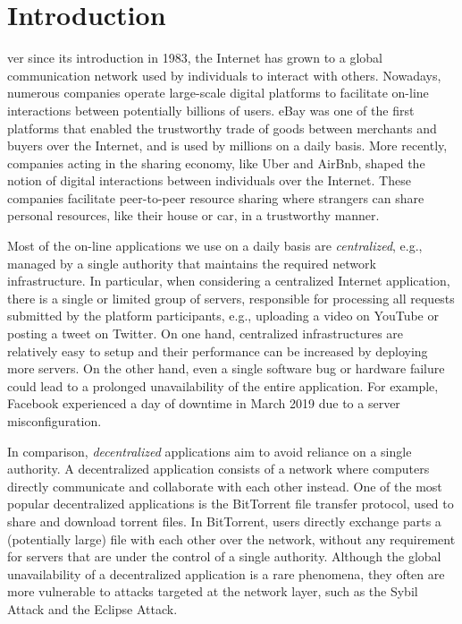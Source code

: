 \chapter{Introduction}
\label{introduction}


ver since its introduction in 1983, the Internet has grown to a global communication network used by individuals to interact with others.
Nowadays, numerous companies operate large-scale digital platforms to facilitate on-line interactions between potentially billions of users.
eBay was one of the first platforms that enabled the trustworthy trade of goods between merchants and buyers over the Internet, and is used by millions on a daily basis.
More recently, companies acting in the sharing economy, like Uber and AirBnb, shaped the notion of digital interactions between individuals over the Internet.
These companies facilitate peer-to-peer resource sharing where strangers can share personal resources, like their house or car, in a trustworthy manner.

Most of the on-line applications we use on a daily basis are \emph{centralized}, e.g., managed by a single authority that maintains the required network infrastructure. %
In particular, when considering a centralized Internet application, there is a single or limited group of servers, responsible for processing all requests submitted by the platform participants, e.g., uploading a video on YouTube or posting a tweet on Twitter.
On one hand, centralized infrastructures are relatively easy to setup and their performance can be increased by deploying more servers.
On the other hand, even a single software bug or hardware failure could lead to a prolonged unavailability of the entire application.
For example, Facebook experienced a day of downtime in March 2019 due to a server misconfiguration.

In comparison, \emph{decentralized} applications aim to avoid reliance on a single authority.
A decentralized application consists of a network where computers directly communicate and collaborate with each other instead.
One of the most popular decentralized applications is the BitTorrent file transfer protocol, used to share and download torrent files.
In BitTorrent, users directly exchange parts a (potentially large) file with each other over the network, without any requirement for servers that are under the control of a single authority.
Although the global unavailability of a decentralized application is a rare phenomena, they often are more vulnerable to attacks targeted at the network layer, such as the Sybil Attack and the Eclipse Attack.

